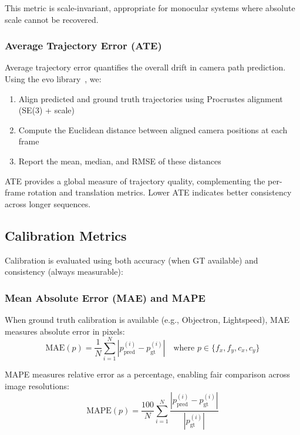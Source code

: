 This metric is scale-invariant, appropriate for monocular systems where absolute scale cannot be recovered.

\subsubsection{Average Trajectory Error (ATE)}

Average trajectory error quantifies the overall drift in camera path prediction. Using the evo library~\parencite{gruber2017evo}, we:
\begin{enumerate}
    \item Align predicted and ground truth trajectories using Procrustes alignment (SE(3) + scale)
    \item Compute the Euclidean distance between aligned camera positions at each frame
    \item Report the mean, median, and RMSE of these distances
\end{enumerate}

ATE provides a global measure of trajectory quality, complementing the per-frame rotation and translation metrics. Lower ATE indicates better consistency across longer sequences.

\subsection{Calibration Metrics}\label{sec:calib-metrics}

Calibration is evaluated using both accuracy (when GT available) and consistency (always measurable):

\subsubsection{Mean Absolute Error (MAE) and MAPE}

When ground truth calibration is available (e.g., Objectron, Lightspeed), MAE measures absolute error in pixels:
\begin{equation}
    \text{MAE}(p) = \frac{1}{N} \sum_{i=1}^N |p_{\text{pred}}^{(i)} - p_{\text{gt}}^{(i)}| \quad \text{where } p \in \{f_x, f_y, c_x, c_y\}
\end{equation}

MAPE measures relative error as a percentage, enabling fair comparison across image resolutions:
\begin{equation}
    \text{MAPE}(p) = \frac{100}{N} \sum_{i=1}^N \frac{|p_{\text{pred}}^{(i)} - p_{\text{gt}}^{(i)}|}{|p_{\text{gt}}^{(i)}|}
\end{equation}

